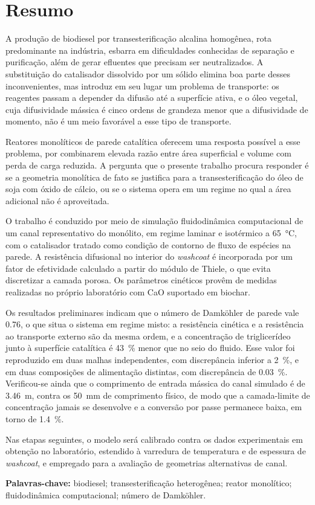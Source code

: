 \chapter*{Resumo}

A produção de biodiesel por transesterificação alcalina homogênea, rota
predominante na indústria, esbarra em dificuldades conhecidas de separação e
purificação, além de gerar efluentes que precisam ser neutralizados. A
substituição do catalisador dissolvido por um sólido elimina boa parte desses
inconvenientes, mas introduz em seu lugar um problema de transporte: os
reagentes passam a depender da difusão até a superfície ativa, e o óleo vegetal,
cuja difusividade mássica é cinco ordens de grandeza menor que a difusividade de
momento, não é um meio favorável a esse tipo de transporte.

Reatores monolíticos de parede catalítica oferecem uma resposta possível a esse
problema, por combinarem elevada razão entre área superficial e volume com perda
de carga reduzida. A pergunta que o presente trabalho procura responder é se a
geometria monolítica de fato se justifica para a transesterificação do óleo de
soja com óxido de cálcio, ou se o sistema opera em um regime no qual a área
adicional não é aproveitada.

O trabalho é conduzido por meio de simulação fluidodinâmica computacional de um
canal representativo do monólito, em regime laminar e isotérmico a \SI{65}{\celsius},
com o catalisador tratado como condição de contorno de fluxo de espécies na
parede. A resistência difusional no interior do \textit{washcoat} é incorporada
por um fator de efetividade calculado a partir do módulo de Thiele, o que evita
discretizar a camada porosa. Os parâmetros cinéticos provêm de medidas
realizadas no próprio laboratório com CaO suportado em biochar.

Os resultados preliminares indicam que o número de Damköhler de parede vale
\num{0.76}, o que situa o sistema em regime misto: a resistência cinética e a
resistência ao transporte externo são da mesma ordem, e a concentração de
triglicerídeo junto à superfície catalítica é \SI{43}{\percent} menor que no seio
do fluido. Esse valor foi reproduzido em duas malhas independentes, com discrepância
inferior a \SI{2}{\percent}, e em duas composições de alimentação distintas,
com discrepância de \SI{0.03}{\percent}. Verificou-se ainda que o comprimento de entrada mássica do
canal simulado é de \SI{3.46}{\meter}, contra os \SI{50}{\milli\meter} de
comprimento físico, de modo que a camada-limite de concentração jamais se
desenvolve e a conversão por passe permanece baixa, em torno de
\SI{1.4}{\percent}.

Nas etapas seguintes, o modelo será calibrado contra os dados experimentais em
obtenção no laboratório, estendido à varredura de temperatura e de espessura de
\textit{washcoat}, e empregado para a avaliação de geometrias alternativas de
canal.

\vspace{10pt}
\noindent\textbf{Palavras-chave:} biodiesel; transesterificação heterogênea;
reator monolítico; fluidodinâmica computacional; número de Damköhler.
